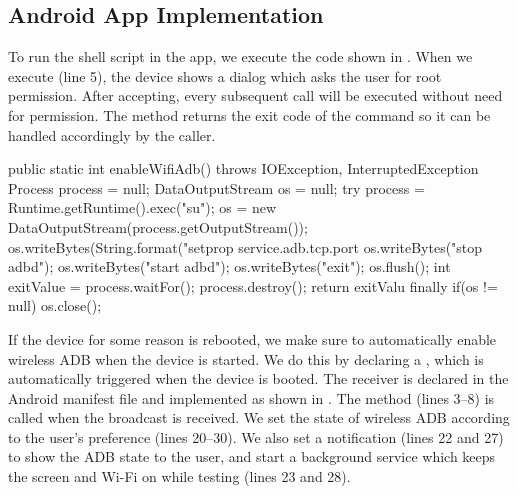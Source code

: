 
\subsection{Android App Implementation}
To run the shell script in the app, we execute the code shown in . When we execute  (line 5), the device shows a dialog which asks the user for root permission. After accepting, every subsequent  call will be executed without need for permission. The method returns the exit code of the command so it can be handled accordingly by the caller.
\begin{javacode}[float=tbp,label=lst:android_app_shell,caption=Enable wireless ADB in Android (written in Java)]
public static int enableWifiAdb() throws IOException, InterruptedException {
  Process process = null;
  DataOutputStream os = null;
  try {
    process = Runtime.getRuntime().exec("su");
    os = new DataOutputStream(process.getOutputStream());
    os.writeBytes(String.format("setprop service.adb.tcp.port %
    os.writeBytes("stop adbd\n");
    os.writeBytes("start adbd\n");
    os.writeBytes("exit\n");
    os.flush();
    int exitValue = process.waitFor();
    process.destroy();
    return exitValu
  } finally {
    if(os != null) {
      os.close();
    }
  }
}
\end{javacode}
If the device for some reason is rebooted, we make sure to automatically enable wireless ADB when the device is started. We do this by declaring a , which is automatically triggered when the device is booted. The receiver is declared in the Android manifest file and implemented as shown in . The  method (lines 3--8) is called when the broadcast is received. We set the state of wireless ADB according to the user's preference (lines 20--30). We also set a notification (lines 22 and 27) to show the ADB state to the user, and start a background service which keeps the screen and Wi-Fi on while testing (lines 23 and 28).

